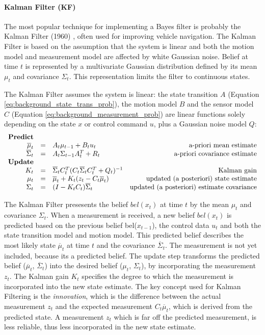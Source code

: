\paragraph{Kalman Filter (KF)}
The most popular technique for implementing a Bayes filter is probably the Kalman Filter (1960) \cite{kalman1960new}, often used for improving vehicle navigation.
The Kalman Filter is based on the assumption that the system is linear and both the motion model and measurement model are affected by white Gaussian noise.
Belief at time $t$ is represented by a multivariate Gaussian distribution defined by its mean $\mu_t$ and covariance $\Sigma_t$.
This representation limits the filter to continuous states.

The Kalman Filter assumes the system is linear: the state transition $A$ (Equation \ref{eq:background_state_trans_prob}), the motion model $B$ and the sensor model $C$ (Equation \ref{eq:background_measurement_prob}) are linear functions solely depending on the state $x$ or control command $u$, plus a Gaussian noise model $Q$:
\begin{equation}
\label{eq:KF}
\begin{array}{rclr}
\text{\textbf{Predict}} \\
\overline{\mu}_t & = & A_t \mu_{t-1} + B_t u_t  & \text{a-priori mean estimate} \\
\overline{\Sigma}_t & = & A_t \Sigma_{t-1} A_t^T + R_t  & \text{a-priori covariance estimate} \\
\text{\textbf{Update}} \\
K_t & = & \overline{\Sigma}_t C_t^T (C_t \overline{\Sigma}_t C_t^T + Q_t)^{-1} & \text{Kalman gain} \\
\mu_t & = & \overline{\mu}_t + K_t(z_t - C_t \overline{\mu}_t) & \text{updated (a posteriori) state estimate} \\
\Sigma_t & = & (I - K_t C_t) \overline{\Sigma}_t & \text{updated (a posteriori) estimate covariance}
\end{array}
\end{equation}

The Kalman Filter presesents the belief $bel(x_t)$ at time $t$ by the mean $\mu_t$ and covariance $\Sigma_t$.
When a measurement is received, a new belief $bel(x_t)$ is predicted based on the previous belief bel($x_{t-1}$), the control data $u_t$ and both the state transition model and motion model.
This predicted belief describes the most likely state $\overline{\mu}_t$ at time $t$ and the covariance $\overline{\Sigma}_t$.
The measurement is not yet included, because its a predicted belief.
The update step transforms the predicted belief ($\overline{\mu}_t$, $\overline{\Sigma}_t$) into the desired belief ($\mu_t$, $\Sigma_t$), by incorporating the measurement $z_t$.
The Kalman gain $K_t$ specifies the degree to which the measurement is incorporated into the new state estimate.
The key concept used for Kalman Filtering is the \textit{innovation}, which is the difference between the actual measurement $z_t$ and the expected measurement $C_t \overline{\mu}_t$, which is derived from the predicted state.
A measurement $z_t$ which is far off the predicted measurement, is less reliable, thus less incorporated in the new state estimate.

